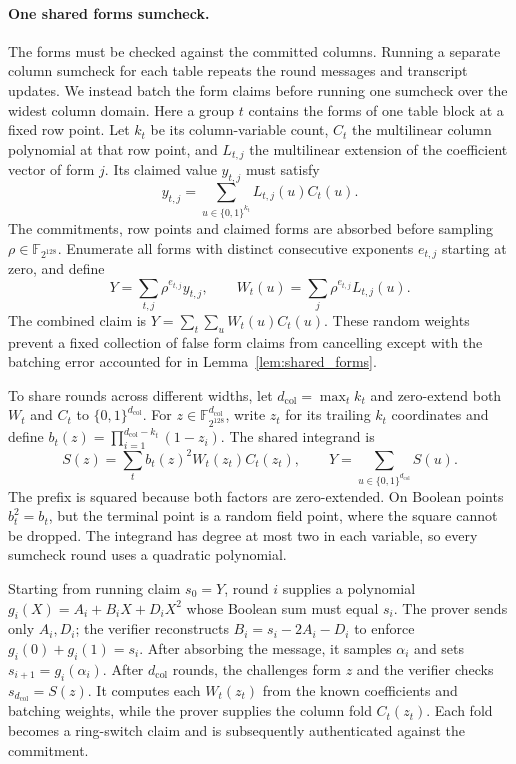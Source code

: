 \documentclass[11pt]{article}
\newcommand{\F}{\mathbb{F}_{2^{128}}}
\begin{document}
\paragraph{One shared forms sumcheck.} The forms must be checked against
the committed columns. Running a separate column sumcheck for each table
repeats the round messages and transcript updates. We instead batch the
form claims before running one sumcheck over the widest column domain.
Here a group $t$ contains the forms of one table block at a fixed row
point. Let $k_t$ be its column-variable count, $C_t$ the multilinear
column polynomial at that row point, and $L_{t,j}$ the multilinear
extension of the coefficient vector of form $j$. Its claimed value
$y_{t,j}$ must satisfy
\[
  y_{t,j}=\sum_{u\in\{0,1\}^{k_t}}L_{t,j}(u)C_t(u).
\]
The commitments, row points and claimed forms are absorbed before sampling
$\rho\in\F$. Enumerate all forms with distinct consecutive exponents
$e_{t,j}$ starting at zero, and define
\[
  Y=\sum_{t,j}\rho^{e_{t,j}}y_{t,j},\qquad
  W_t(u)=\sum_j\rho^{e_{t,j}}L_{t,j}(u).
\]
The combined claim is $Y=\sum_t\sum_u W_t(u)C_t(u)$. These random weights
prevent a fixed collection of false form claims from cancelling except
with the batching error accounted for in Lemma~\ref{lem:shared_forms}.

To share rounds across different widths, let
$d_{\mathrm{col}}=\max_t k_t$ and zero-extend both $W_t$ and $C_t$ to
$\{0,1\}^{d_{\mathrm{col}}}$. For $z\in\F^{d_{\mathrm{col}}}$, write $z_t$
for its trailing $k_t$ coordinates and define
$b_t(z)=\prod_{i=1}^{d_{\mathrm{col}}-k_t}(1-z_i)$. The shared integrand is
\[
  S(z)=\sum_t b_t(z)^2 W_t(z_t)C_t(z_t),\qquad
  Y=\sum_{u\in\{0,1\}^{d_{\mathrm{col}}}}S(u).
\]
The prefix is squared because both factors are zero-extended. On Boolean
points $b_t^2=b_t$, but the terminal point is a random field point, where
the square cannot be dropped. The integrand has degree at most two in
each variable, so every sumcheck round uses a quadratic polynomial.

Starting from running claim $s_0=Y$, round $i$ supplies a polynomial
$g_i(X)=A_i+B_iX+D_iX^2$ whose Boolean sum must equal $s_i$.
The prover sends only $A_i,D_i$; the verifier reconstructs
$B_i=s_i-2A_i-D_i$ to enforce $g_i(0)+g_i(1)=s_i$. After absorbing the
message, it samples $\alpha_i$ and sets $s_{i+1}=g_i(\alpha_i)$.
After $d_{\mathrm{col}}$ rounds, the challenges form $z$ and the verifier
checks $s_{d_{\mathrm{col}}}=S(z)$. It computes each $W_t(z_t)$ from the
known coefficients and batching weights, while the prover supplies the
column fold $C_t(z_t)$. Each fold becomes a ring-switch claim and is
subsequently authenticated against the commitment.
\end{document}
